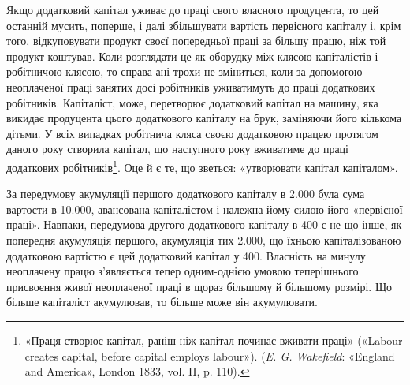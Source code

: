 Якщо додатковий капітал уживає до праці свого власного
продуцента, то цей останній мусить, поперше, і далі збільшувати
вартість первісного капіталу і, крім того, відкуповувати продукт
своєї попередньої праці за більшу працю, ніж той продукт коштував.
Коли розглядати це як оборудку між клясою капіталістів
і робітничою клясою, то справа ані трохи не зміниться,
коли за допомогою неоплаченої праці занятих досі робітників
уживатимуть до праці додаткових робітників. Капіталіст, може,
перетворює додатковий капітал на машину, яка викидає продуцента
цього додаткового капіталу на брук, заміняючи його
кількома дітьми. У всіх випадках робітнича кляса своєю додатковою
працею протягом даного року створила капітал, що наступного
року вживатиме до праці додаткових робітників\footnote{
«Праця створює капітал, раніш ніж капітал починає вживати
праці» («Labour creates capital, before capital employs labour»). (\emph{E. G.
Wakefield}: «England and America», London 1833, vol. II, p. 110).
}. Оце й є те, що зветься: «утворювати капітал капіталом».

За передумову акумуляції першого додаткового капіталу в
\num{2.000} була сума вартости в \num{10.000},
авансована капіталістом і належна йому силою його
«первісної праці». Навпаки, передумова другого додаткового
капіталу в 400 є не що інше, як попередня акумуляція
першого, акумуляція тих \num{2.000}, що
їхньою капіталізованою додатковою вартістю є цей додатковий
капітал у 400. Власність на минулу неоплачену
працю з’являється тепер одним-однією умовою теперішнього
присвоєння живої неоплаченої праці в щораз більшому й
більшому розмірі. Що більше капіталіст акумулював, то більше
може він акумулювати.

